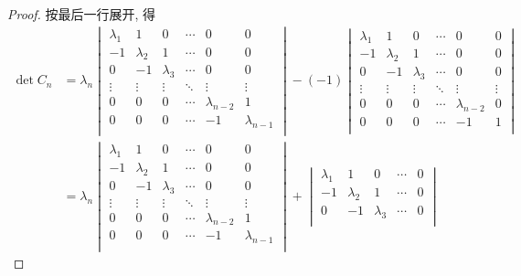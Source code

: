 \documentclass[color=black,device=normal,lang=cn,mode=geye]{elegantnote}
\begin{document}
\begin{landscape}
    \begin{proof}
        按最后一行展开, 得
        \begin{align*}
            \det C_n & =\lambda_n\begin{vmatrix}
            \lambda_1 & 1 & 0 & \cdots & 0 & 0 \\
            -1 & \lambda_2 & 1 & \cdots & 0 & 0 \\
            0 & -1 & \lambda_3 & \cdots & 0 & 0 \\
            \vdots & \vdots & \vdots & \ddots & \vdots & \vdots \\
            0 & 0 & 0 & \cdots & \lambda_{n-2} & 1 \\
            0 & 0 & 0 & \cdots & -1 & \lambda_{n-1} \\
        \end{vmatrix}-(-1)\begin{vmatrix}
            \lambda_1 & 1 & 0 & \cdots & 0 & 0 \\
            -1 & \lambda_2 & 1 & \cdots & 0 & 0 \\
            0 & -1 & \lambda_3 & \cdots & 0 & 0 \\
            \vdots & \vdots & \vdots & \ddots & \vdots & \vdots \\
            0 & 0 & 0 & \cdots & \lambda_{n-2} & 0 \\
            0 & 0 & 0 & \cdots & -1 & 1 \\
        \end{vmatrix} \\
            & =\lambda_n\begin{vmatrix}
            \lambda_1 & 1 & 0 & \cdots & 0 & 0 \\
            -1 & \lambda_2 & 1 & \cdots & 0 & 0 \\
            0 & -1 & \lambda_3 & \cdots & 0 & 0 \\
            \vdots & \vdots & \vdots & \ddots & \vdots & \vdots \\
            0 & 0 & 0 & \cdots & \lambda_{n-2} & 1 \\
            0 & 0 & 0 & \cdots & -1 & \lambda_{n-1} \\
        \end{vmatrix}+\begin{vmatrix}
            \lambda_1 & 1 & 0 & \cdots & 0 \\
            -1 & \lambda_2 & 1 & \cdots & 0 \\
            0 & -1 & \lambda_3 & \cdots & 0 \\

\end{vmatrix}
\end{align*}
\end{proof}
\end{landscape}
\end{document}
